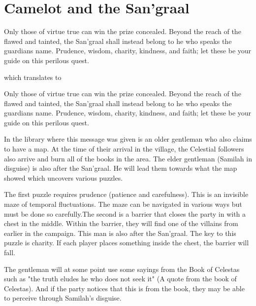 \section{Camelot and the San'graal}

\begin{center}
	{\Large{} 
		Only those of virtue true can win the prize concealed. Beyond the reach of the flawed and tainted, the San'graal shall instead belong to he who speaks the guardians name. Prudence, wisdom, charity, kindness, and faith; let these be your guide on this perilous quest.
	}
\end{center}

which translates to

\begin{center}
	Only those of virtue true can win the prize concealed. Beyond the reach of the flawed and tainted, the San'graal shall instead belong to he who speaks the guardians name. Prudence, wisdom, charity, kindness, and faith; let these be your guide on this perilous quest.
\end{center}

In the library where this message was given is an older gentleman who also claims to have a map. At the time of their arrival in the village, the Celestial followers also arrive and burn all of the books in the area. The elder gentleman (Samilah in disguise) is also after the San'graal. He will lead them towards what the map showed which uncovers various puzzles. 

The first puzzle requires prudence (patience and carefulness). This is an invisible maze of temporal fluctuations. The maze can be navigated in various ways but must be done so carefully.The second is a barrier that closes the party in with a chest in the middle. Within the barrier, they will find one of the villains from earlier in the campaign. This man is also after the San'graal. The key to this puzzle is charity. If each player places something inside the chest, the barrier will fall.

The gentleman will at some point use some sayings from the Book of Celestas such as "the truth eludes he who does not seek it" (A quote from the book of Celestas). And if the party notices that this is from the book, they may be able to perceive through Samilah's disguise. 

